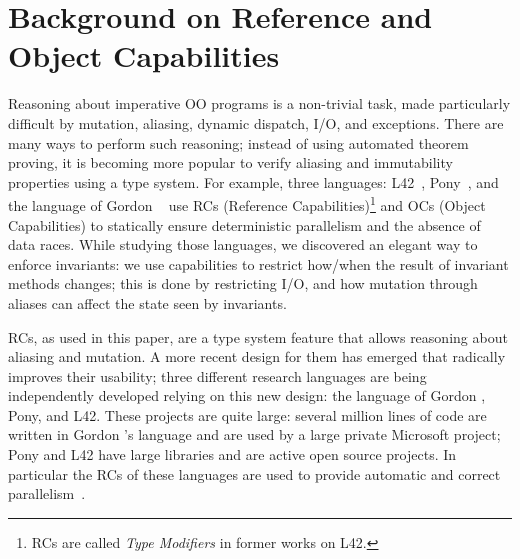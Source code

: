 \section{Background on Reference and Object Capabilities}
\label{s:TMsAndOCs}
Reasoning about imperative OO programs is a non-trivial task,
made particularly difficult by mutation, aliasing, dynamic dispatch, I/O, and exceptions. There are many ways to perform such reasoning;
instead of using automated theorem proving, 
it is becoming more popular to verify aliasing and immutability properties using a type system.
For example, three languages: L42~\cite{ServettoZucca15,ServettoEtAl13a,JOT:issue_2011_01/article1,GianniniEtAl16}, Pony~\cite{clebsch2015deny,clebsch2017orca}, and the language of Gordon \etal~\cite{GordonEtAl12} use RCs (Reference Capabilities)\footnote{RCs are called \emph{Type Modifiers} in former works on L42.} and OCs (Object Capabilities) to statically ensure  deterministic parallelism and the absence of data races.
While studying those languages, we discovered an elegant way to enforce invariants: we use capabilities to restrict how/when the result of invariant methods changes; this is done by restricting I/O, and how mutation through aliases can affect the state seen by invariants.


RCs, as used in this paper, are a type system feature that allows reasoning about aliasing and mutation. A more recent design for them has emerged that radically improves their usability;
three different research languages are being independently developed relying on this new design: the language of Gordon \etal, Pony, and L42.
These projects are quite large: several million lines of code are written in Gordon \etal's language and are used by a large private Microsoft project; Pony and L42 have large libraries and are active open source projects. In particular the RCs of these languages are used to provide automatic and correct parallelism~\cite{GordonEtAl12,clebsch2015deny,clebsch2017orca,ServettoEtAl13a}.

